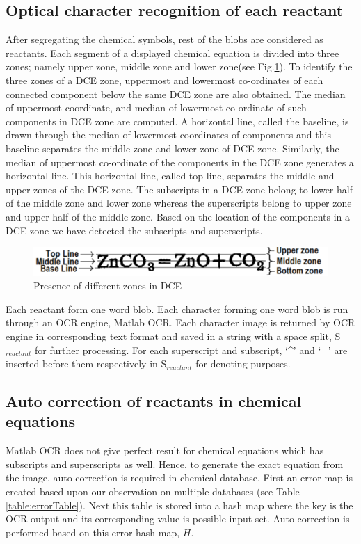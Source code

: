 \documentclass[conference]{IEEEtran}
\begin{document}
\subsection{Optical character recognition of each reactant}
After segregating the chemical symbols, rest of the blobs are considered as reactants. 
Each segment of a displayed chemical equation is divided into three zones; namely upper zone, middle zone and lower zone(see Fig.\ref{fig:supSub}). To identify the three zones of a DCE zone, uppermost and lowermost co-ordinates of each connected component below the same DCE zone are also obtained. The median of uppermost coordinate, and median of lowermost co-ordinate of such components in DCE zone are computed. A horizontal line, called the baseline, is drawn through the median of lowermost coordinates of components and this baseline separates the middle zone and lower zone of DCE zone. Similarly, the median of uppermost co-ordinate of the components in the DCE zone generates a horizontal line. This horizontal line, called top line, separates the middle and upper zones of the DCE zone. The subscripts in a DCE zone belong to lower-half of the middle zone and lower zone whereas the superscripts belong to upper zone and upper-half of the middle zone. Based on the location of the components in a DCE zone we have detected the subscripts and superscripts.
\begin{figure}[h!]
\centering
\includegraphics[width=0.9\linewidth]{supSub} 
\caption{Presence of different zones in DCE}
\label{fig:supSub}
\end{figure}
Each reactant form one word blob. Each character forming one word blob is run through an OCR engine, Matlab OCR. Each character image is returned by OCR engine in corresponding text format and saved in a string with a space split, S$_{reactant}$ for further processing. For each superscript and subscript, `\^{}'  and  `\_' are inserted before them respectively in S$_{reactant}$ for denoting purposes.
\subsection{Auto correction of reactants in chemical equations}
Matlab OCR does not give perfect result for chemical equations which has subscripts and superscripts as well. Hence, to generate the exact equation from the image, auto correction is required in chemical database. First an error map is created based upon our observation on multiple databases (see Table \ref{table:errorTable}). Next this table is stored into a hash map where the key is the OCR output and its corresponding value is possible input set. Auto correction is performed based on this error hash map, $H$.
\end{document}
